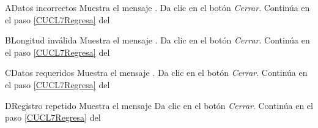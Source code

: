
\begin{UCtrayectoriaA}{A}{Datos incorrectos}
	\UCpaso Muestra el mensaje . 
	\UCpaso[\UCactor] Da clic en el botón \textit{Cerrar}.
	\UCpaso[\UCactor] Continúa en el paso \ref{CUCL7Regresa} del 

\end{UCtrayectoriaA} 

\begin{UCtrayectoriaA}{B}{Longitud inválida}
	\UCpaso Muestra el mensaje . 
	\UCpaso[\UCactor] Da clic en el botón \textit{Cerrar}.
	\UCpaso[\UCactor] Continúa en el paso \ref{CUCL7Regresa} del 

\end{UCtrayectoriaA}

\begin{UCtrayectoriaA}{C}{Datos requeridos}
	\UCpaso Muestra el mensaje . 
	\UCpaso[\UCactor] Da clic en el botón \textit{Cerrar}.
	\UCpaso[\UCactor] Continúa en el paso \ref{CUCL7Regresa} del 

\end{UCtrayectoriaA}

\begin{UCtrayectoriaA}{D}{Registro repetido}
	\UCpaso Muestra el mensaje   
	\UCpaso[\UCactor] Da clic en el botón \textit{Cerrar}.
	\UCpaso[\UCactor] Continúa en el paso \ref{CUCL7Regresa} del 

\end{UCtrayectoriaA}


		
